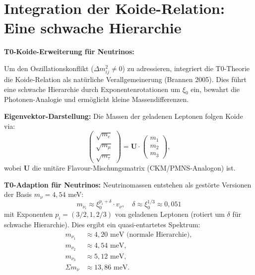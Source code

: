 	\section{Integration der Koide-Relation: Eine schwache Hierarchie}
	
	\begin{koidebox}
		\textbf{T0-Koide-Erweiterung für Neutrinos:}
		
		Um den Oszillationskonflikt ($\Delta m^2_{ij} \neq 0$) zu adressieren, integriert die T0-Theorie die Koide-Relation als natürliche Verallgemeinerung (Brannen 2005). Dies führt eine schwache Hierarchie durch Exponentenrotationen um $\xi_0$ ein, bewahrt die Photonen-Analogie und ermöglicht kleine Massendifferenzen.
		
		\textbf{Eigenvektor-Darstellung:}
		Die Massen der geladenen Leptonen folgen Koide via:
		\begin{equation}
			\begin{pmatrix}
				\sqrt{m_e} \\
				\sqrt{m_\mu} \\
				\sqrt{m_\tau}
			\end{pmatrix}
			= \mathbf{U} \cdot \begin{pmatrix}
				m_1 \\
				m_2 \\
				m_3
			\end{pmatrix},
		\end{equation}
		wobei $\mathbf{U}$ die unitäre Flavour-Mischungsmatrix (CKM/PMNS-Analogon) ist.
		
		\textbf{T0-Adaption für Neutrinos:}
		Neutrinomassen entstehen als gestörte Versionen der Basis $m_\nu = 4,54$ meV:
		\begin{equation}
			m_{\nu_i} \approx \xi_0^{p_i + \delta} \cdot v_\nu, \quad \delta \approx \xi_0^{1/3} \approx 0,051
		\end{equation}
		mit Exponenten $p_i = (3/2, 1, 2/3)$ von geladenen Leptonen (rotiert um $\delta$ für schwache Hierarchie). Dies ergibt ein quasi-entartetes Spektrum:
		\begin{align}
			m_{\nu_1} &\approx 4,20 \text{ meV (normale Hierarchie)}, \\
			m_{\nu_2} &\approx 4,54 \text{ meV}, \\
			m_{\nu_3} &\approx 5,12 \text{ meV}, \\
			\Sigma m_\nu &\approx 13,86 \text{ meV}.
		\end{align}
		

\end{koidebox}
